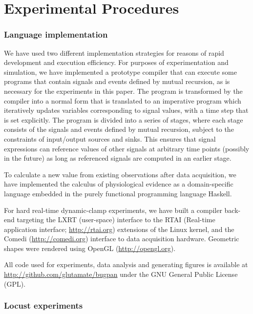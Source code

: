 \section*{Experimental Procedures}

\subsubsection*{Language implementation}

We have used two different implementation strategies for reasons of
rapid development and execution efficiency. For purposes of
experimentation and simulation, we have implemented a prototype
compiler that can execute some programs that contain signals and
events defined by mutual recursion, as is necessary for the
experiments in this paper. The program is transformed by the compiler
into a normal form that is translated to an imperative program which
iteratively updates variables corresponding to signal values, with a
time step that is set explicitly. The program is divided into a series
of stages, where each stage consists of the signals and events defined
by mutual recursion, subject to the constraints of input/output
sources and sinks. This ensures that signal expressions can reference
values of other signals at arbitrary time points (possibly in the
future) as long as referenced signals are computed in an earlier
stage.

To calculate a new value from existing observations after data
acquisition, we have implemented the calculus of physiological
evidence as a domain-specific language embedded in the purely functional
programming language Haskell.

For hard real-time dynamic-clamp experiments, we have built a compiler
back-end targeting the LXRT (user-space) interface to the RTAI (Real-time
application interface; \url{http://rtai.org}) extensions of the Linux
kernel, and the Comedi (\url{http://comedi.org}) interface to data
acquisition hardware. Geometric shapes were rendered using OpenGL
(\url{http://opengl.org}).

All code used for experiments, data analysis and generating figures is
available at \url{http://github.com/glutamate/bugpan} under the GNU General
Public License (GPL).

\subsubsection*{Locust experiments}

